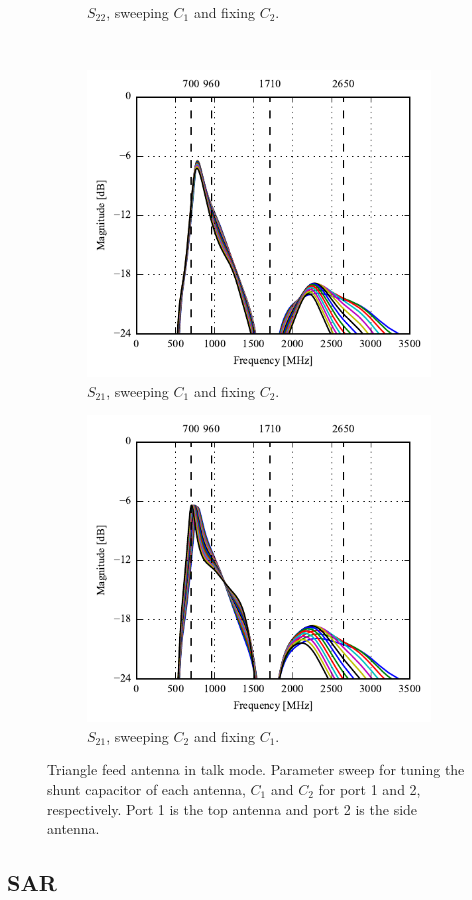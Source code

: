\begin{figure}[htbp]
\begin{subfigure}[b]{0.49\linewidth}
        \caption{$S_{22}$, sweeping $C_1$ and fixing $C_2$.}
    \end{subfigure}
    \\
    \begin{subfigure}[b]{0.49\linewidth}
        \centering
        \includegraphics{img/tech_sol/trianglefeed/talk_mode/Csh1s21.pdf}
        \caption{$S_{21}$, sweeping $C_1$ and fixing $C_2$.}
    \end{subfigure}
    \hfill
    \begin{subfigure}[b]{0.49\linewidth}
        \centering
        \includegraphics{img/tech_sol/trianglefeed/talk_mode/Csh2s21.pdf}
        \caption{$S_{21}$, sweeping $C_2$ and fixing $C_1$.}
    \end{subfigure}
    \caption{Triangle feed antenna in talk mode. Parameter sweep for tuning the shunt capacitor of each antenna, $C_1$ and $C_2$ for port 1 and 2, respectively. Port 1 is the top antenna and port 2 is the side antenna.}
    \label{fig:tiang_sparam_sweep_talk}
\end{figure}

\subsection{SAR}


